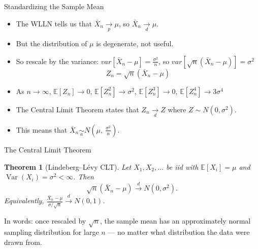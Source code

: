 \documentclass[handout, aspectratio=169]{beamer}
\newtheorem{thm}{Theorem}
\numberwithin{equation}{section}
\begin{document}
\begin{frame}{Standardizing the Sample Mean}
\begin{itemize}
\item The WLLN tells us that $\bar{X}_n\underset{p}{\to} \mu$, so $\bar{X}_n\underset{d}{\to} \mu$.
\item But the distribution of $\mu$ is degenerate,  not useful.
\item So rescale by the variance: $var[\bar{X}_n-\mu]=\frac{\sigma^2}{n}$, so $var[\sqrt{n}(\bar{X}_n-\mu)]=\sigma^2$
$$Z_n=\sqrt{n}(\bar{X}_n-\mu)$$
\item As $n\to \infty$, $\mathbb{E}[Z_n]\rightarrow0$, $\mathbb{E}[Z_n^2]\rightarrow\sigma^2$, $\mathbb{E}[Z_n^3]\rightarrow0$, $\mathbb{E}[Z_n^4]\rightarrow 3\sigma^4$
\item The Central Limit Theorem states that $Z_n\underset{d}{\to}Z$ where $Z\sim N(0, \sigma^2)$.
\item This means that $\bar{X}_n\underset{a}{\sim}N(\mu,\ \frac{\sigma^2}{n})$.
\end{itemize}
\end{frame}


\begin{frame}{The Central Limit Theorem}

\begin{thm}[Lindeberg--L\'evy CLT]
Let $X_1, X_2, \ldots$ be iid with $\mathbb{E}[X_i] = \mu$ and $\operatorname{Var}(X_i) = \sigma^2 < \infty$. Then
\[
\sqrt{n}(\bar{X}_n - \mu) \overset{d}{\to} N(0, \sigma^2).
\]
Equivalently, $\displaystyle \frac{\bar{X}_n - \mu}{\sigma/\sqrt{n}} \overset{d}{\to} N(0, 1)$.
\end{thm}

\pause

\medskip

In words: once rescaled by $\sqrt n$, the sample mean has an approximately normal sampling distribution for large $n$ --- no matter what distribution the data were drawn from.

\end{frame}

\end{document}
